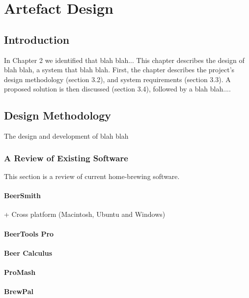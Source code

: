 \chapter{Artefact Design} \label{a-d}

\section{Introduction} \label{a-d--introduction}

In Chapter 2 we identified that blah blah...
This chapter describes the design of blah blah, a system that blah blah.  First, the chapter describes the project’s design methodology (section 3.2), and system requirements (section 3.3).  A proposed solution is then discussed (section 3.4), followed by a blah blah....


\section{Design Methodology} \label{a-d--methodology}

The design and development of blah blah

\subsection{A Review of Existing Software} \label{a-d--review-of-existing-software}

This section is a review of current home-brewing software.

\subsubsection{BeerSmith}

+ Cross platform (Macintosh, Ubuntu and Windows)

\subsubsection{BeerTools Pro}
\subsubsection{Beer Calculus}
\subsubsection{ProMash}
\subsubsection{BrewPal}
